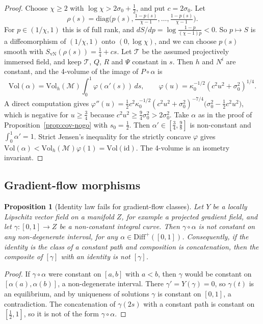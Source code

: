\documentclass[11pt,a4paper,reqno]{amsart}
\newtheorem{proposition}[theorem]{Proposition}
\theoremstyle{definition}
\numberwithin{equation}{section}
\begin{document}
\begin{proof}
Choose $\chi\ge2$ with $\log\chi>2\sigma_0+\tfrac12$, and put $c=2\sigma_0$. Let
\[
\rho(s)=\mathrm{diag}\Big(p(s),\tfrac{1-p(s)}{\chi-1},\dots,\tfrac{1-p(s)}{\chi-1}\Big).
\]
For $p\in(1/\chi,1)$ this is of full rank, and $dS/dp=\log\frac{1-p}{(\chi-1)p}<0$. So $p\mapsto S$ is a diffeomorphism of $(1/\chi,1)$ onto $(0,\log\chi)$, and we can choose $p(s)$ smooth with $S_{\mathrm{vN}}(\rho(s))=\tfrac14+cs$. Let $\mathcal{T}$ be the assumed projectively immersed field, and keep $\mathcal{T}$, $Q$, $R$ and $\Psi$ constant in $s$. Then $h$ and $N^i$ are constant, and the 4-volume of the image of $P\circ\alpha$ is
\[
\mathrm{Vol}(\alpha)=\mathrm{Vol}_h(\mathcal{M})\int_0^1\varphi(\alpha'(s))\,ds,\qquad\varphi(u)=\kappa_0^{-1/2}(c^2u^2+\sigma_0^2)^{1/4}.
\]
A direct computation gives $\varphi''(u)=\tfrac12c^2\kappa_0^{-1/2}(c^2u^2+\sigma_0^2)^{-7/4}\big(\sigma_0^2-\tfrac12c^2u^2\big)$, which is negative for $u\ge\tfrac34$ because $c^2u^2\ge\tfrac94\sigma_0^2>2\sigma_0^2$. Take $\alpha$ as in the proof of Proposition~\ref{prop:cov-nogo} with $s_0=\tfrac12$. Then $\alpha'\in[\tfrac34,\tfrac98]$ is non-constant and $\int_0^1\alpha'=1$. Strict Jensen's inequality for the strictly concave $\varphi$ gives $\mathrm{Vol}(\alpha)<\mathrm{Vol}_h(\mathcal{M})\varphi(1)=\mathrm{Vol}(\mathrm{id})$. The 4-volume is an isometry invariant.
\end{proof}

\subsection{Gradient-flow morphisms}

\begin{proposition}[Identity law fails for gradient-flow classes]\label{prop:gradient}
Let $Y$ be a locally Lipschitz vector field on a manifold $Z$, for example a projected gradient field, and let $\gamma:[0,1]\to Z$ be a non-constant integral curve. Then $\gamma\circ\alpha$ is not constant on any non-degenerate interval, for any $\alpha\in\mathrm{Diff}^+([0,1])$. Consequently, if the identity is the class of a constant path and composition is concatenation, then the composite of $[\gamma]$ with an identity is not $[\gamma]$.
\end{proposition}

\begin{proof}
If $\gamma\circ\alpha$ were constant on $[a,b]$ with $a<b$, then $\gamma$ would be constant on $[\alpha(a),\alpha(b)]$, a non-degenerate interval. There $\gamma'=Y(\gamma)=0$, so $\gamma(t)$ is an equilibrium, and by uniqueness of solutions $\gamma$ is constant on $[0,1]$, a contradiction. The concatenation of $\gamma(2s)$ with a constant path is constant on $[\tfrac12,1]$, so it is not of the form $\gamma\circ\alpha$.
\end{proof}
\end{document}
